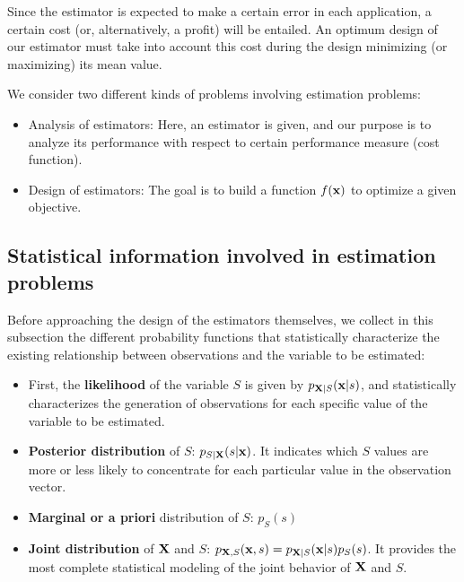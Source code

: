  Since the estimator is expected to make a certain error in each application, a certain cost  (or, alternatively, a profit) will be entailed. An optimum design of our estimator must take into account this cost during the design minimizing (or maximizing) its mean value.


We consider two different kinds of problems involving estimation problems:
\begin{itemize}
    \item Analysis of estimators: Here, an estimator is given, and our purpose is to analyze its performance with respect to certain performance measure (cost function).
    \item Design of estimators: The goal is to build a function $f(\bf x)$ to optimize a given objective.
\end{itemize}

\subsection{Statistical information involved in estimation problems}
\label{subsec:statistical_info}

Before approaching the design of the estimators themselves, we collect in this subsection the different probability functions that statistically characterize the existing relationship between observations and the variable to be estimated:

\begin{itemize}
\item First, the {\bf likelihood} of the  variable $S$ is given by $p_{{\bf X}|S}({\bf x}|s)$, and statistically characterizes the generation of observations for each specific value of the variable to be estimated.
\item {\bf Posterior distribution} of $S$: $p_{S|{\bf X}}(s|{\bf x})$. It indicates which $S$ values are more or less likely to concentrate for each particular value in the observation vector.
\item {\bf Marginal or a priori} distribution of $S$: $p_S(s)$
\item {\bf Joint distribution} of ${\bf X}$ and $S$: $p_{{\bf X},S}({\bf x},s) = p_{{\bf X}|S}({\bf x}|s) p_S(s)$. It provides the most complete statistical modeling of the joint behavior of $\bf X$ and $S$.

\end{itemize} 

